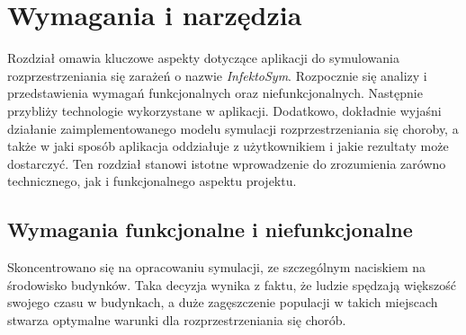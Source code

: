\chapter{Wymagania i narzędzia}
\label{ch:wymagania-i-narzedzia}
Rozdział omawia kluczowe aspekty dotyczące aplikacji do symulowania rozprzestrzeniania się zarażeń o nazwie \textit{InfektoSym}. Rozpocznie się analizy i przedstawienia wymagań funkcjonalnych oraz niefunkcjonalnych. Następnie przybliży technologie wykorzystane w aplikacji. Dodatkowo, dokładnie wyjaśni działanie zaimplementowanego modelu symulacji rozprzestrzeniania się choroby, a także w jaki sposób aplikacja oddziałuje z użytkownikiem i jakie rezultaty może dostarczyć. Ten rozdział stanowi istotne wprowadzenie do zrozumienia zarówno technicznego, jak i funkcjonalnego aspektu projektu.

\section{\textbf{Wymagania funkcjonalne i niefunkcjonalne}}

Skoncentrowano się na opracowaniu symulacji, ze szczególnym naciskiem na środowisko budynków. Taka decyzja wynika z faktu, że ludzie spędzają większość swojego czasu w budynkach, a duże zagęszczenie populacji w takich miejscach stwarza optymalne warunki dla rozprzestrzeniania się chorób.

